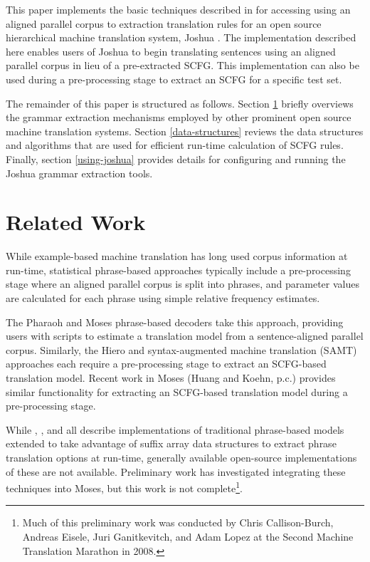 \documentclass{pbml}
\newcommand{\newcite}{\namecite}
\begin{document}
This paper implements the basic techniques described in \newcite{Lopez2008} for accessing using an aligned parallel corpus to extraction translation rules for an open source hierarchical machine translation system, Joshua \cite{Joshua-WMT}. The implementation described here enables users of Joshua to begin translating sentences using an aligned parallel corpus in lieu of a pre-extracted SCFG. This implementation can also be used during a pre-processing stage to extract an SCFG for a specific test set.

The remainder of this paper is structured as follows. Section \ref{related-work} briefly overviews the grammar extraction mechanisms employed by other prominent open source machine translation systems. Section \ref{data-structures} reviews the data structures and algorithms that are used for efficient run-time calculation of SCFG rules. Finally, section \ref{using-joshua} provides details for configuring and running the Joshua grammar extraction tools.


\section{Related Work}
\label{related-work}

While example-based machine translation has long used corpus information at run-time, statistical phrase-based approaches typically include a pre-processing stage where an aligned parallel corpus is split into phrases, and parameter values are calculated for each phrase using simple relative frequency estimates.

The Pharaoh \cite{Koehn2004} and Moses \cite{Moses} phrase-based decoders take this approach, providing users with scripts to estimate a translation model from a sentence-aligned parallel corpus. Similarly, the Hiero \cite{Chiang2007} and syntax-augmented machine translation (SAMT) \cite{samt2006} approaches each require a pre-processing stage to extract an SCFG-based translation model. Recent work in Moses (Huang and Koehn, p.c.) provides similar functionality for extracting an SCFG-based translation model during a pre-processing stage.

While \newcite{Callison-Burch2005b}, \newcite{Zhang2005}, and \newcite{Lopez2008} all describe implementations of traditional phrase-based models extended to take advantage of suffix array data structures to extract phrase translation options at run-time, generally available open-source implementations of these are not available. Preliminary work has investigated integrating these techniques into Moses, but this work is not complete\footnote{Much of this preliminary work was conducted by Chris Callison-Burch, Andreas Eisele, Juri Ganitkevitch, and Adam Lopez at the Second Machine Translation Marathon in 2008.}. 
\end{document}
